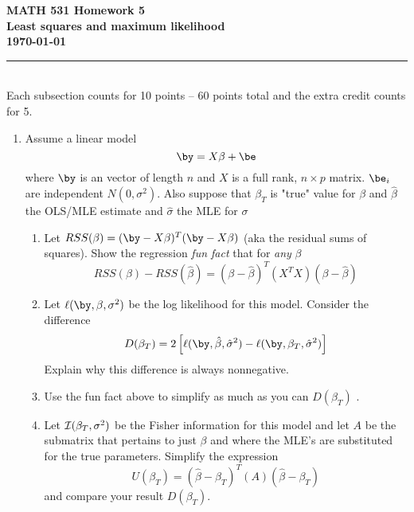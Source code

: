 \documentclass[10pt]{report}
\begin{document}
\vspace*{-1in}
\noindent
{\LARGE  \bf  \sc  MATH 531  Homework 5  \\
  }
\noindent
{\Large \bf   Least squares and maximum likelihood \\ \today} 
\ \\
{\color{orange3} \hrule  }
\ \\
Each subsection counts for 10 points  -- 60 points total and the extra credit counts for 5.  
\begin{enumerate}
\item  
 Assume a linear model 
\[  \by = X \beta + \be \]
where $\by$ is an vector of length $n$ and $X$ is a full rank,
 $n\times p$ matrix. $\be_i$ are independent $N(0,\sigma^2)$. Also suppose that $\beta_T$ is "true" value for $\beta$ and $\hat \beta$ the OLS/MLE estimate and $\hat{\sigma}$ the MLE for $\sigma$

\begin{enumerate}
 \item Let $RSS(\beta) = ( \by - X\beta)^T ( \by - X\beta)$ (aka the residual sums of squares). 
Show the  regression {\it fun fact} that  for {\it any} $\beta$ 
 \[ RSS(\beta) - RSS(\hat{\beta}) = (\beta -\hat{\beta})^T (X^TX) (\beta -\hat{\beta}) \]
 
\item   Let $\ell( \by, \beta, \sigma^2) $ be the log likelihood for this model. 
 Consider the  difference 
  \[ D(\beta_T) = 2 \left[ \ell( \by, \hat{\beta},  \hat{\sigma}^2) - \ell( \by, \beta_T,  \hat{\sigma}^2)  \right] \]
Explain why this difference is always nonnegative. 
\item Use the fun fact above to simplify  as much as you can $D(\beta_T)$ .

\item Let ${ \cal I}(\beta_T, \sigma^2)$ be the Fisher information  for this model and let $A$ be the submatrix that pertains to just $\beta$ and where the MLE's are substituted for the true parameters. 
  Simplify the expression 
\[ U(\beta_T)= (\hat{\beta} - \beta_T)^T  (A) (\hat{\beta} - \beta_T) \]
and compare your result  $D(\beta_T)$.
\\
 \end{enumerate}
 



\end{enumerate}
\end{document}
